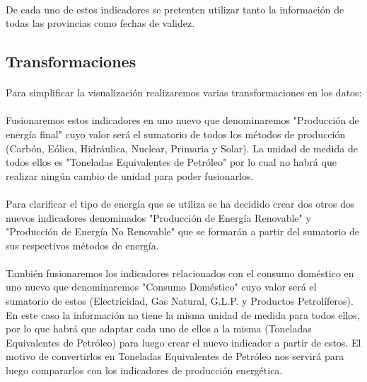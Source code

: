 \documentclass{article}
\begin{document}
			\paragraph{}
			De cada uno de estos indicadores se pretenten utilizar tanto la información de todas las provincias como fechas de validez.

		\subsection{Transformaciones}

			\paragraph{}
			Para simplificar la visualización realizaremos varias transformaciones en los datos:

			\paragraph{}
			Fusionaremos estos indicadores en uno nuevo que denominaremos "Producción de energía final" cuyo valor será el sumatorio de todos los métodos de producción (Carbón, Eólica, Hidráulica, Nuclear, Primaria y Solar). La unidad de medida de todos ellos es "Toneladas Equivalentes de Petróleo" por lo cual no habrá que realizar ningún cambio de unidad para poder fusionarlos.

			\paragraph{}
			Para clarificar el tipo de energía que se utiliza se ha decidido crear dos otros dos nuevos indicadores denominados "Producción de Energía Renovable" y "Producción de Energía No Renovable" que se formarán a partir del sumatorio de sus respectivos métodos de energía.

			\paragraph{}
			 También fusionaremos los indicadores relacionados con el consumo doméstico en uno nuevo que  denominaremos  "Consumo Doméstico" cuyo valor será el sumatorio de estos (Electricidad, Gas Natural, G.L.P. y Productos Petrolíferos). En este caso la información no tiene la misma unidad de medida para todos ellos, por lo que habrá que adaptar cada uno de ellos a la misma (Toneladas Equivalentes de Petróleo) para luego crear el nuevo indicador a partir de estos. El motivo de convertirlos en Toneladas Equivalentes de Petróleo nos servirá para luego compararlos con los indicadores de  producción energética.
\end{document}
